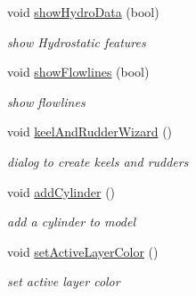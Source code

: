 \begin{DoxyCompactItemize}
void \hyperlink{classShipCAD_1_1Controller_a29d2c68605ec90055ae0aa27761f2b08}{show\-Hydro\-Data} (bool)
\begin{DoxyCompactList}\small\item\em show Hydrostatic features \end{DoxyCompactList}\item 
void \hyperlink{classShipCAD_1_1Controller_a74187705f2260e641293b2f369757f98}{show\-Flowlines} (bool)
\begin{DoxyCompactList}\small\item\em show flowlines \end{DoxyCompactList}\item 
void \hyperlink{classShipCAD_1_1Controller_acaba200143a2ae5e7ea8d423633bcdf5}{keel\-And\-Rudder\-Wizard} ()
\begin{DoxyCompactList}\small\item\em dialog to create keels and rudders \end{DoxyCompactList}\item 
void \hyperlink{classShipCAD_1_1Controller_a8d257c1c04ae4e6780e91ad53ba767d8}{add\-Cylinder} ()
\begin{DoxyCompactList}\small\item\em add a cylinder to model \end{DoxyCompactList}\item 
void \hyperlink{classShipCAD_1_1Controller_aa471985ce00a517249c2b476db9d4ac6}{set\-Active\-Layer\-Color} ()
\begin{DoxyCompactList}\small\item\em set active layer color \end{DoxyCompactList}\end{DoxyCompactItemize}
